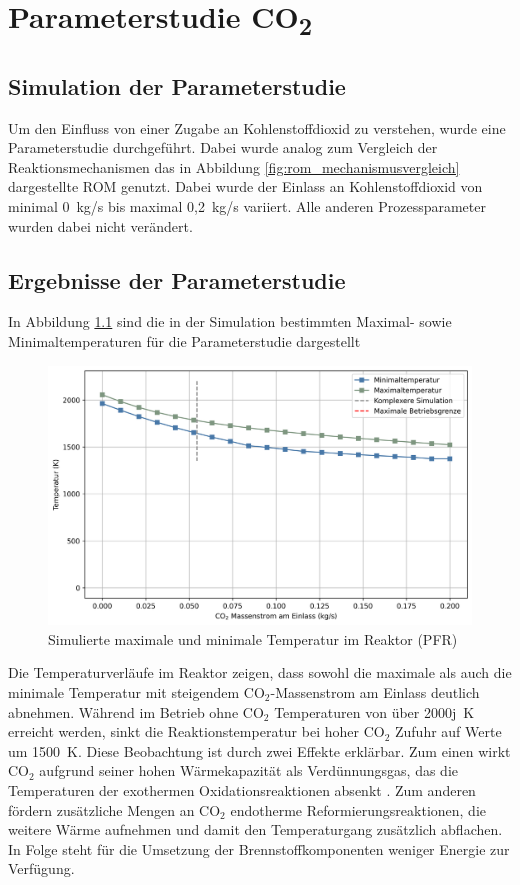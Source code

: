 \chapter{Parameterstudie CO\textsubscript{2}}
\iffalse 
    \section{Simulation der Parameterstudie}
    Um den Einfluss von einer Zugabe an Kohlenstoffdioxid zu verstehen, wurde eine Parameterstudie durchgeführt. Dabei wurde analog zum Vergleich der Reaktionsmechanismen das in Abbildung \ref{fig:rom_mechanismusvergleich} dargestellte ROM genutzt. Dabei wurde der Einlass an Kohlenstoffdioxid von minimal 0~kg/s bis maximal 0,2~kg/s variiert. Alle anderen Prozessparameter wurden dabei nicht verändert. 
    \section{Ergebnisse der Parameterstudie}
    In Abbildung \ref{fig:parameterstudie_temperaturen} sind die in der Simulation bestimmten Maximal- sowie Minimaltemperaturen für die Parameterstudie dargestellt
    \begin{figure}[H]
        \centering
        \includegraphics[width=0.9\linewidth]{img/Parameterstudie_CO2/Parameterstudie_CO2_Temperaturen.png}
        \caption{Simulierte maximale und minimale Temperatur im Reaktor (PFR)}
        \label{fig:parameterstudie_temperaturen}
    \end{figure}
    Die Temperaturverläufe im Reaktor zeigen, dass sowohl die maximale als auch die minimale Temperatur mit steigendem CO$_2$-Massenstrom am Einlass deutlich abnehmen. Während im Betrieb ohne CO$_2$ Temperaturen von über 2000j~K erreicht werden, sinkt die Reaktionstemperatur bei hoher CO$_2$ Zufuhr auf Werte um 1500~K. Diese Beobachtung ist durch zwei Effekte erklärbar. Zum einen wirkt 
    CO$_2$ aufgrund seiner hohen Wärmekapazität als Verdünnungsgas, das die Temperaturen der exothermen Oxidationsreaktionen absenkt \cite{NIST_CO2_WebBook_General}. Zum anderen fördern zusätzliche Mengen an CO$_2$ endotherme Reformierungsreaktionen, die weitere Wärme aufnehmen und damit den Temperaturgang zusätzlich abflachen. In Folge steht für die Umsetzung der Brennstoffkomponenten weniger Energie zur Verfügung. 


